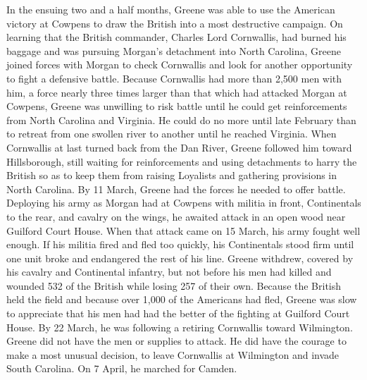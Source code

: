 In the ensuing two and a half months, Greene was able to use the American victory at
Cowpens to draw the British into a most destructive campaign. On learning that the British
commander, Charles Lord Cornwallis, had burned his baggage and was pursuing Morgan's
detachment into North Carolina, Greene joined forces with Morgan to check Cornwallis
and look for another opportunity to fight a defensive battle. Because Cornwallis had more
than 2,500 men with him, a force nearly three times larger than that which had attacked
Morgan at Cowpens, Greene was unwilling to risk battle until he could get reinforcements
from North Carolina and Virginia. He could do no more until late February than to retreat
from one swollen river to another until he reached Virginia. When Cornwallis at last turned
back from the Dan River, Greene followed him toward Hillsborough, still waiting for
reinforcements and using detachments to harry the British so as to keep them from raising
Loyalists and gathering provisions in North Carolina. By 11 March, Greene had the forces
he needed to offer battle. Deploying his army as Morgan had at Cowpens with militia in
front, Continentals to the rear, and cavalry on the wings, he awaited attack in an open
wood near Guilford Court House. When that attack came on 15 March, his army fought
well enough. If his militia fired and fled too quickly, his Continentals stood firm until one
unit broke and endangered the rest of his line. Greene withdrew, covered by his cavalry
and Continental infantry, but not before his men had killed and wounded 532 of the British
while losing 257 of their own. Because the British held the field and because over 1,000 of
the Americans had fled, Greene was slow to appreciate that his men had had the better of
the fighting at Guilford Court House. By 22 March, he was following a retiring Cornwallis
toward Wilmington. Greene did not have the men or supplies to attack. He did have the
courage to make a most unusual decision, to leave Cornwallis at Wilmington and invade
South Carolina. On 7 April, he marched for Camden.

